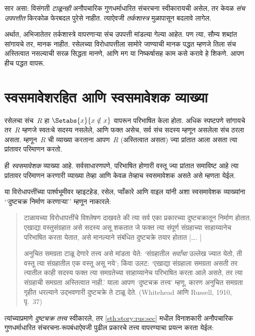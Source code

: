सार असा:
विसंगती
\emph{टाळूनही}
अनौपचारिक
गुणधर्माधारित
संचरचना
स्वीकारायची
असेल, तर
केवळ \emph{संच
उपपत्तीत}
किरकोळ फेरबदल
पुरेसे नाहीत.
त्याऐवजी
\emph{तर्कशास्त्र}
मुळापासून
बदलावे लागेल.

अर्थात,
अभिजातेतर
तर्कशास्त्रे
वापरणाऱ्या
संच उपपत्ती
मांडल्या गेल्या
आहेत. पण
त्या, सौम्य
शब्दांत सांगायचे
तर, मानक
नाहीत.
रसेलच्या
विरोधापत्तीला
सामोरे जाण्याची
मानक पद्धत
म्हणजे तिला
संच अस्तित्वात
नसल्याची
सरळ सिद्धता
मानणे, आणि
मग या निष्कर्षासह
काम कसे करावे
हे शिकणे.
आपण हीच
पद्धत वापरू.









\section{स्वसमावेशरहित आणि स्वसमावेशक व्याख्या}\label{sth:story:predicative:sec}

रसेलचा संच~$R$ हा
$\Setabs{x}{x \notin
x}$ वापरून परिभाषित
केला होता. अधिक
स्पष्टपणे सांगायचे
तर~$R$ म्हणजे
स्वतःचे सदस्य
नसलेले, आणि
फक्त असेच,
सर्व संच सदस्य
म्हणून असलेला
संच ठरला असता.
म्हणून~$R$ ची
व्याख्या करताना
आपण~$R$
(अस्तित्वात असता)
ज्या प्रांतात
आला असता
त्या प्रांतावर
परिमाणन करतो.

ही \emph{स्वसमावेशक}
व्याख्या आहे.
सर्वसाधारणपणे,
परिभाषित होणारी
वस्तू ज्या
प्रांतात समाविष्ट
आहे त्या
प्रांतावर
परिमाणन करणारी
व्याख्या तेव्हा
आणि केवळ तेव्हाच
स्वसमावेशक
असते असे
म्हणता येईल.

या विरोधापत्तींच्या
पार्श्वभूमीवर
व्हाइटहेड, रसेल,
प्वाँकारे आणि
वाइल यांनी
अशा स्वसमावेशक
व्याख्यांना
‘‘दुष्टचक्र निर्माण
करणाऱ्या’’ म्हणून
नाकारले:
\begin{quote}
  टाळायच्या
  विरोधापत्तींचे
  विश्लेषण
  दाखवते की
  त्या सर्व
  एका प्रकारच्या
  दुष्टचक्रातून
  निर्माण होतात.
  एखाद्या
  वस्तुसंग्रहात
  असे सदस्य
  असू शकतात
  जे फक्त
  त्या संपूर्ण
  संग्रहाच्या
  साहाय्यानेच
  परिभाषित
  करता येतात,
  असे मानल्याने
  संबंधित दुष्टचक्रे
  तयार होतात
  [\ldots. \textparagraph]

  अनुचित समग्रता
  टाळू देणारे
  तत्त्व असे
  मांडता येते:
  ‘संग्रहातील
  \emph{सर्वांचा}
  उल्लेख ज्यात
  येतो, ती
  वस्तू त्या
  संग्रहातील
  एक वस्तू
  असू नये’;
  किंवा उलट:
  ‘एखाद्या
  संग्रहाला
  समग्रता असती
  तर त्यातील
  काही सदस्य
  फक्त त्या
  समग्रतेच्या
  साहाय्यानेच
  परिभाषित
  करता आले
  असते, तर
  त्या संग्रहाची
  समग्रता
  अस्तित्वात
  नाही.’ याला
  आपण
  ‘दुष्टचक्र
  तत्त्व’
  म्हणू,
  कारण
  अनुचित
  समग्रता
  गृहीत
  धरल्याने
  उद्भवणारी
  दुष्टचक्रे
  ते टाळू
  देते.
  (Whitehead आणि Russell, 1910, पृ.~37)
\end{quote}
त्यांच्याप्रमाणे
\emph{दुष्टचक्र तत्त्व}
स्वीकारले, तर
\ref{sth:story:rus:sec}
मधील विनाशकारी
अनौपचारिक
गुणधर्माधारित
संचरचना-रूपबंधाऐवजी
पुढील प्रकारचे
तत्त्व वापरण्याचा
प्रयत्न करता
येईल:

